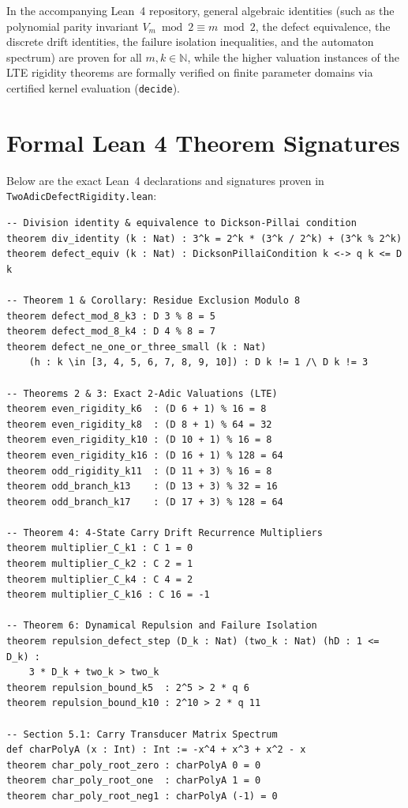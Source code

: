 \documentclass[11pt,reqno]{amsart}
\theoremstyle{definition}
\numberwithin{equation}{section}
\begin{document}
In the accompanying Lean~4 repository, general algebraic identities (such as the polynomial parity invariant $V_m \bmod 2 \equiv m \bmod 2$, the defect equivalence, the discrete drift identities, the failure isolation inequalities, and the automaton spectrum) are proven for all $m, k \in \mathbb{N}$, while the higher valuation instances of the LTE rigidity theorems are formally verified on finite parameter domains via certified kernel evaluation (\texttt{decide}).

\appendix
\section{Formal Lean 4 Theorem Signatures}
Below are the exact Lean~4 declarations and signatures proven in \texttt{TwoAdicDefectRigidity.lean}:

\begin{footnotesize}
\begin{verbatim}
-- Division identity & equivalence to Dickson-Pillai condition
theorem div_identity (k : Nat) : 3^k = 2^k * (3^k / 2^k) + (3^k % 2^k)
theorem defect_equiv (k : Nat) : DicksonPillaiCondition k <-> q k <= D k

-- Theorem 1 & Corollary: Residue Exclusion Modulo 8
theorem defect_mod_8_k3 : D 3 % 8 = 5
theorem defect_mod_8_k4 : D 4 % 8 = 7
theorem defect_ne_one_or_three_small (k : Nat)
    (h : k \in [3, 4, 5, 6, 7, 8, 9, 10]) : D k != 1 /\ D k != 3

-- Theorems 2 & 3: Exact 2-Adic Valuations (LTE)
theorem even_rigidity_k6  : (D 6 + 1) % 16 = 8
theorem even_rigidity_k8  : (D 8 + 1) % 64 = 32
theorem even_rigidity_k10 : (D 10 + 1) % 16 = 8
theorem even_rigidity_k16 : (D 16 + 1) % 128 = 64
theorem odd_rigidity_k11  : (D 11 + 3) % 16 = 8
theorem odd_branch_k13    : (D 13 + 3) % 32 = 16
theorem odd_branch_k17    : (D 17 + 3) % 128 = 64

-- Theorem 4: 4-State Carry Drift Recurrence Multipliers
theorem multiplier_C_k1 : C 1 = 0
theorem multiplier_C_k2 : C 2 = 1
theorem multiplier_C_k4 : C 4 = 2
theorem multiplier_C_k16 : C 16 = -1

-- Theorem 6: Dynamical Repulsion and Failure Isolation
theorem repulsion_defect_step (D_k : Nat) (two_k : Nat) (hD : 1 <= D_k) :
    3 * D_k + two_k > two_k
theorem repulsion_bound_k5  : 2^5 > 2 * q 6
theorem repulsion_bound_k10 : 2^10 > 2 * q 11

-- Section 5.1: Carry Transducer Matrix Spectrum
def charPolyA (x : Int) : Int := -x^4 + x^3 + x^2 - x
theorem char_poly_root_zero : charPolyA 0 = 0
theorem char_poly_root_one  : charPolyA 1 = 0
theorem char_poly_root_neg1 : charPolyA (-1) = 0
\end{verbatim}
\end{footnotesize}
\end{document}
